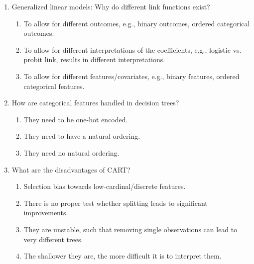 \begin{enumerate}
\item Generalized linear models: Why do different link functions exist? 
\begin{enumerate}
	\item To allow for different outcomes, e.g., binary outcomes, ordered categorical outcomes. 
	\item To allow for different interpretations of the coefficients, e.g., logistic vs. probit link, results in different interpretations. 
	\item To allow for different features/covariates, e.g., binary features, ordered categorical features.
\end{enumerate}

\item How are categorical features handled in decision trees?
\begin{enumerate}
	\item They need to be one-hot encoded.
	\item They need to have a natural ordering.
	\item They need no natural ordering.
\end{enumerate}

\item What are the disadvantages of CART? 
\begin{enumerate}
	\item Selection bias towards low-cardinal/discrete features.
	\item There is no proper test whether splitting leads to significant improvements.
	\item They are unstable, such that removing single observations can lead to very different trees.
	\item The shallower they are, the more difficult it is to interpret them.
\end{enumerate}

\end{enumerate}